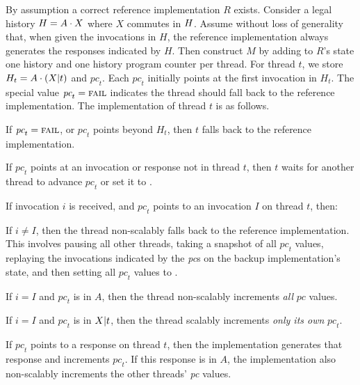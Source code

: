 By assumption a correct reference implementation $R$ exists.
%
Consider a legal history  $H = A \cdot X$ where $X$ commutes in
$H$.
%
Assume without loss of generality that, when given the invocations in
$H$, the reference implementation always generates the responses
indicated by $H$.
%
%
Then construct $M$ by adding to $R$'s state one history and one history
program counter per thread.
%
For thread $t$, we store $H_t = A \cdot
  (X|t)$ and $\textit{pc}_t$. Each $\textit{pc}_t$
  initially points at the first invocation in $H_t$. The special value
  $\textit{pc}_t = \textsc{fail}$ indicates the thread should fall back to the
  reference implementation.
%
The implementation of thread $t$ is as follows.
  \begin{CompactEnumerate}
\item If $\textit{pc}_t = \textsc{fail}$, or $\textit{pc}_t$ points beyond
  $H_t$, then $t$ falls back to the reference implementation.
\item If $\textit{pc}_t$ points at an invocation or response not in
  thread $t$, then $t$ waits for another thread to advance
  $\textit{pc}_t$ or set it to \FAIL.
\item If invocation $i$ is received, and $\textit{pc}_t$ points to an
  invocation $I$ on thread $t$, then:
  \begin{CompactEnumerate}
\item If $i \neq I$, then the thread non-scalably falls back to the
  reference implementation. This involves pausing all other threads, taking
  a snapshot of all $\textit{pc}_t$ values, replaying the
  invocations indicated by the \textit{pc}s on the backup
  implementation's state, and then setting all $\textit{pc}_t$ values to
  \FAIL.
\item If $i = I$ and $\textit{pc}_t$ is in $A$, then the thread
  non-scalably increments \emph{all} $\textit{pc}$ values.
\item If $i = I$ and $\textit{pc}_t$ is in $X|t$, then the
  thread scalably increments \emph{only its own} $\textit{pc}_t$.
  \end{CompactEnumerate}
\item If $\textit{pc}_t$ points to a response on thread $t$, then the
  implementation generates that response and increments $\textit{pc}_t$.
  If this response is in $A$, the implementation also
  non-scalably increments the other threads' \textit{pc} values.
\end{CompactEnumerate}

